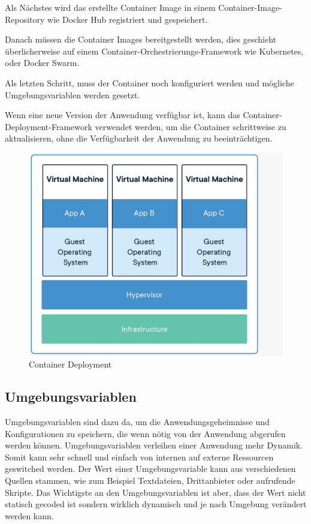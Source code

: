Als Nächstes wird das erstellte Container Image in einem Container-Image-Repository wie Docker Hub registriert und gespeichert.

Danach müssen die Container Images bereitgestellt werden, dies geschieht überlicherweise auf einem Container-Orchestrierungs-Framework wie Kubernetes, oder Docker Swarm.

Als letzten Schritt, muss der Container noch konfiguriert werden und mögliche Umgebungsvariablen werden gesetzt.

Wenn eine neue Version der Anwendung verfügbar ist, kann das Container-Deployment-Framework verwendet werden, um die Container schrittweise zu aktualisieren, ohne die Verfügbarkeit der Anwendung zu beeinträchtigen.


\begin{figure}[h!]
    \centering
    \includegraphics[width=0.6\linewidth]{pics/container_deployment.jpeg}
    \caption{Container Deployment}
    \label{fig:enter-label}
\end{figure}

\subsection{Umgebungsvariablen}

Umgebungsvariablen sind dazu da, um die Anwendungsgeheimnisse und Konfigurationen zu speichern, die wenn nötig von der Anwendung abgerufen werden können. Umgebungsvariablen verleihen einer Anwendung mehr Dynamik. Somit kann sehr schnell und einfach von internen auf externe Ressourcen geswitched werden. Der Wert einer Umgebungsvariable kann aus verschiedenen Quellen stammen, wie zum Beispiel Textdateien, Drittanbieter oder aufrufende Skripte. Das Wichtigste an den Umgebungsvariablen ist aber, dass der Wert nicht statisch gecoded ist sondern wirklich dynamisch und je nach Umgebung verändert werden kann.

